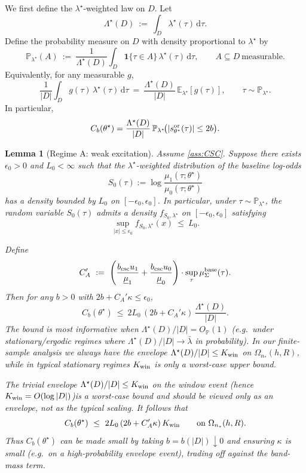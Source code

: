 \documentclass{statsoc}
\newtheorem{lemma}[lemma]{Lemma}
\newcommand{\dd}{\mathrm{d}}
\newcommand{\1}{\mathbbm{1}}
\begin{document}
We first define the $\lambda^\star$-weighted law on $D$. Let
\[
\Lambda^\star(D)\ :=\ \int_D \lambda^\star(\tau)\,\dd\tau.
\]
Define the probability measure on $D$ with density proportional to $\lambda^\star$ by
\[
\mathbb P_{\lambda^\star}(A)
\ :=\ \frac{1}{\Lambda^\star(D)}\int_D \mathbf 1\{\tau\in A\}\,\lambda^\star(\tau)\,\dd\tau,
\qquad A\subseteq D\ \text{measurable}.
\]
Equivalently, for any measurable $g$,
\[
\frac{1}{|D|}\int_D g(\tau)\,\lambda^\star(\tau)\,\dd\tau
\ =\ \frac{\Lambda^\star(D)}{|D|}\,\mathbb E_{\lambda^\star}[g(\tau)],
\qquad \tau\sim \mathbb P_{\lambda^\star}.
\]
In particular,
\[
C_b(\theta^\star)=\frac{\Lambda^\star(D)}{|D|}\,
\mathbb P_{\lambda^\star}\!\big(|s^{\rm or}_{\theta^\star}(\tau)|\le 2b\big).
\]


\begin{lemma}[Regime A: weak excitation]\label{lem:regA}
Assume \cref{ass:CSC}. Suppose there exists $\epsilon_0>0$ and $L_0<\infty$ such that the $\lambda^\star$-weighted distribution of the baseline log-odds
\[
S_0(\tau):=\log\frac{\mu_1(\tau;\theta^\star)}{\mu_0(\tau;\theta^\star)}
\]
has a density bounded by $L_0$ on $[-\epsilon_0,\epsilon_0]$. In particular, under $\tau\sim\mathbb P_{\lambda^\star}$,
the random variable $S_0(\tau)$ admits a density $f_{S_0,\lambda^\star}$ on $[-\epsilon_0,\epsilon_0]$ satisfying
\[
\sup_{|x|\le \epsilon_0} f_{S_0,\lambda^\star}(x)\ \le\ L_0.
\]

Define
\[
C_A'\ :=\ \left(\frac{b_{\rm csc}u_1}{\underline\mu_1} + \frac{b_{\rm csc}u_0}{\underline\mu_0}\right)\cdot \sup_{\tau}\mu_\Sigma^{\rm base}(\tau).
\]
Then for any $b>0$ with $2b+C_A'\kappa\le \epsilon_0$,
\[
C_b(\theta^\star)
\ \le\ 2L_0\,(2b+C_A'\kappa)\,\frac{\Lambda^\star(D)}{|D|}.
\]
The bound is most informative when $\Lambda^\star(D)/|D|=O_{\mathbb P}(1)$ (e.g.\ under stationary/ergodic regimes where $\Lambda^\star(D)/|D|\to \bar\lambda$ in probability). In our finite-sample analysis we always have the envelope $\Lambda^\star(D)/|D|\le K_{\rm win}$ on $\Omega_{n_*}(h,R)$, while in typical stationary regimes $K_{\rm win}$ is only a worst-case upper bound.

The trivial envelope $\Lambda^\star(D)/|D|\le K_{\rm win}$ on the window event (hence $K_{\rm win}=O(\log|D|)$)is a worst-case bound and should be viewed only as an envelope, not as the typical scaling. It follows that
\[
C_b(\theta^\star)\ \le\ 2L_0\,(2b+C_A'\kappa)\,K_{\rm win}\qquad\text{on }\Omega_{n_*}(h,R).
\]
Thus $C_b(\theta^\star)$ can be made small by taking $b=b(|D|)\downarrow 0$ and ensuring $\kappa$ is small (e.g.\ on a high-probability envelope event), trading off against the band-mass term.

\end{lemma}
\end{document}
